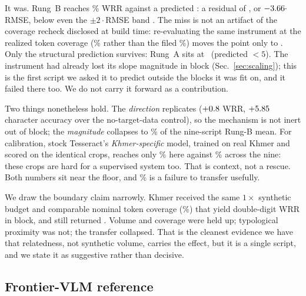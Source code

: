 It was. Rung~B reaches \khmerB\% WRR against a predicted \khmerPred: a residual of \khmerResid,
or $-3.66\cdot$RMSE, below even the $\pm2\cdot$RMSE band \khmerBandTwo. The miss is not
an artifact of the coverage recheck disclosed at build time: re-evaluating the same instrument
at the realized token coverage (\khmerTokCov\% rather than the filed \khmerTokCovPrereg\%) moves
the point only to \khmerPredRecheck. Only the structural prediction survives: Rung~A sits at
\khmerA\ (predicted $<5$). The instrument had already lost its slope magnitude in block
(Sec.~\ref{sec:scaling}); this is the first script we asked it to predict outside the blocks it
was fit on, and it failed there too. We do not carry it forward as a contribution.

Two things nonetheless hold. The \emph{direction} replicates ($+0.8$ WRR, $+5.85$
character accuracy over the no-target-data control), so the mechanism is not inert out of block;
the \emph{magnitude} collapses to \khmerPctOfMeanB\% of the nine-script Rung-B mean. For
calibration, stock Tesseract's \emph{Khmer-specific} model, trained on real Khmer and scored on
the identical crops, reaches only \tessKhmer\% here against \tessMean\% across the nine: these
crops are hard for a supervised system too. That is context, not a rescue. Both numbers sit
near the floor, and \khmerB\% is a failure to transfer usefully.

We draw the boundary claim narrowly. Khmer received the same $1\times$ synthetic budget and
comparable nominal token coverage (\khmerTokCov\%) that yield double-digit WRR in block, and still
returned \khmerB. Volume and coverage were held up; typological proximity was not; the transfer
collapsed. That is the cleanest evidence we have that relatedness, not synthetic volume, carries
the effect, but it is a single script, and we state it as suggestive rather than decisive.

\subsection{Frontier-VLM reference}
\label{sec:vlm}

